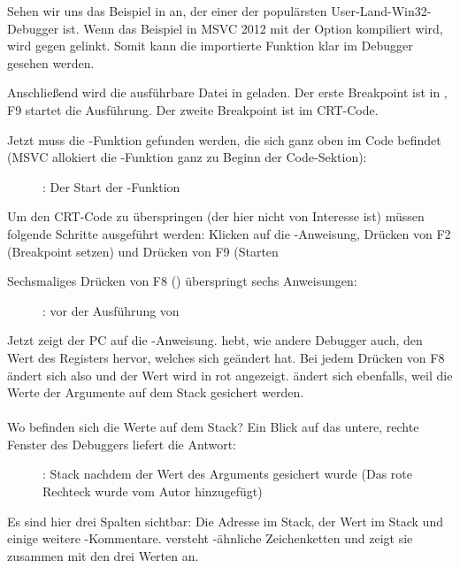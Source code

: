 Sehen wir uns das Beispiel in \olly an, der einer der populärsten User-Land-Win32-Debugger ist.
Wenn das Beispiel in MSVC 2012 mit der Option  kompiliert wird, wird gegen  gelinkt.
Somit kann die importierte Funktion klar im Debugger gesehen werden.

Anschließend wird die ausführbare Datei in \olly geladen.
Der erste Breakpoint ist in , F9 startet die Ausführung.
Der zweite Breakpoint ist im \ac{CRT}-Code.

Jetzt muss die \main-Funktion gefunden werden, die sich ganz oben im Code befindet
(MSVC allokiert die \main-Funktion ganz zu Beginn der Code-Sektion): 
\begin{figure}[H]
\centering
{}
\caption{\olly: Der Start der \main-Funktion}
\label{fig:printf3_olly_1}
\end{figure}

Um den \ac{CRT}-Code zu überspringen (der hier nicht von Interesse ist) müssen
folgende Schritte ausgeführt werden: Klicken auf die -Anweisung,
Drücken von F2 (Breakpoint setzen) und Drücken von F9 (Starten

\clearpage
Sechsmaliges Drücken von F8 (\stepover) überspringt sechs Anweisungen:

\begin{figure}[H]
\centering
{}
\caption{\olly: vor der Ausführung von\printf}
\label{fig:printf3_olly_2}
\end{figure}

Jetzt zeigt der \ac{PC} auf die -Anweisung.
\olly hebt, wie andere Debugger auch, den Wert des Registers hervor, welches sich geändert hat.
Bei jedem Drücken von F8 ändert sich also \EIP und der Wert wird in rot angezeigt.
\ESP ändert sich ebenfalls, weil die Werte der Argumente auf dem Stack gesichert werden.\\
\\
Wo befinden sich die Werte auf dem Stack? Ein Blick auf das untere, rechte Fenster
des Debuggers liefert die Antwort:

\begin{figure}[H]
\centering

\caption{\olly: Stack nachdem der Wert des Arguments gesichert wurde (Das rote Rechteck wurde vom Autor hinzugefügt)}
\end{figure}

Es sind hier drei Spalten sichtbar: Die Adresse im Stack, der Wert im Stack und einige weitere \olly-Kommentare.
\olly versteht \printf{}-ähnliche Zeichenketten und zeigt sie zusammen mit den drei  Werten an.

